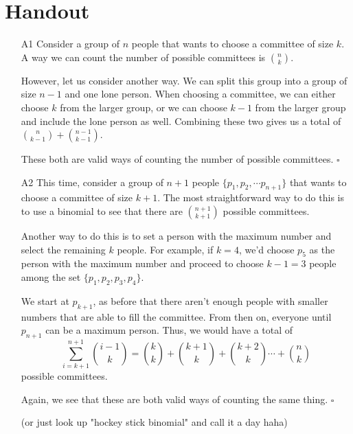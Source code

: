 \documentclass[12pt]{article}
\begin{document}
\section{Handout}\label{sec:handout}
\begin{itemize}
    \item[A1] Consider a group of $n$ people that wants to choose a committee of size $k$.
        A way we can count the number of possible committees is $\binom{n}{k}$.

        However, let us consider another way.
        We can split this group into a group of size $n-1$ and one lone person.
        When choosing a committee, we can either choose $k$ from the larger group,
        or we can choose $k-1$ from the larger group and include the lone person as well.
        Combining these two gives us a total of $\binom{n}{k-1}+\binom{n-1}{k-1}$.

        These both are valid ways of counting the number of possible committees. $\square$
    \item[A2] This time, consider a group of $n+1$ people $\{p_1, p_2, \cdots p_{n+1}\}$
        that wants to choose a committee of size $k+1$.
        The most straightforward way to do this is to use a binomial
        to see that there are $\binom{n+1}{k+1}$ possible committees.

        Another way to do this is to set a person with the maximum number and select the remaining $k$ people.
        For example, if $k=4$, we'd choose $p_5$ as the person with the maximum number and proceed
        to choose $k-1=3$ people among the set $\{p_1, p_2, p_3, p_4\}$.

        We start at $p_{k+1}$, as before that there aren't enough people with smaller numbers
        that are able to fill the committee.
        From then on, everyone until $p_{n+1}$ can be a maximum person.
        Thus, we would have a total of
        \[\sum_{i=k+1}^{n+1} \binom{i-1}{k}=\binom{k}{k}+\binom{k+1}{k}+\binom{k+2}{k} \cdots + \binom{n}{k}\]
        possible committees.

        Again, we see that these are both valid ways of counting the same thing. $\square$

        (or just look up "hockey stick binomial" and call it a day haha)
\end{itemize}
\end{document}
